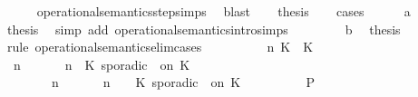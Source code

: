 \begin{isabellebody}
\ \ \ \ \isamarkupfalse%
\ operational{\isacharunderscore}semantics{\isacharunderscore}step{\isachardot}simps\ \isamarkupfalse%
\ blast\isanewline
\ \ \isamarkupfalse%
\ {\isacharquery}thesis\isanewline
\ \ \isamarkupfalse%
\ {\isacharparenleft}cases{\isacharparenright}\isanewline
\ \ \ \ \isamarkupfalse%
\ a\isanewline
\ \ \ \ \ \ \isamarkupfalse%
\ {\isacharquery}thesis\ \isamarkupfalse%
\ {\isacharparenleft}simp\ add{\isacharcolon}\ operational{\isacharunderscore}semantics{\isacharunderscore}intro{\isachardot}simps{\isacharparenright}\isanewline
\ \ \isamarkupfalse%
\isanewline
\ \ \ \ \isamarkupfalse%
\ b\ \isamarkupfalse%
\ {\isacharquery}thesis\isanewline
\ \ \ \ \isamarkupfalse%
\ {\isacharparenleft}rule\ operational{\isacharunderscore}semantics{\isacharunderscore}elim{\isachardot}cases{\isacharparenright}\isanewline
\ \ \ \ \ \ \isamarkupfalse%
\ \ {\isasymGamma}\ n\ K\ {\isasymtau}\ K\ {\isasymPsi}\ {\isasymPhi}\isanewline
\ \ \ \ \ \ \isamarkupfalse%
\ {\isacartoucheopen}{\isacharparenleft}{\isasymGamma}\ n\ {\isasymturnstile}\ {\isasymPsi}\ {\isasymtriangleright}\ {\isasymPhi}\ {\isacharequal}\ {\isacharparenleft}{\isasymGamma}{\isacharcomma}\ n\ {\isasymturnstile}\ {\isacharparenleft}K\ sporadic\ {\isasymtau}\ on\ K\ {\isacharhash}\ {\isasymPsi}\ {\isasymtriangleright}\ {\isasymPhi}{\isacharparenright}{\isacartoucheclose}\isanewline
\ \ \ \ \ \ \ {\isacartoucheopen}{\isacharparenleft}{\isasymGamma}\ n\ {\isasymturnstile}\ {\isasymPsi}\ {\isasymtriangleright}\ {\isasymPhi}\ {\isacharequal}\ {\isacharparenleft}{\isasymGamma}{\isacharcomma}\ n\ {\isasymturnstile}\ {\isasymPsi}\ {\isasymtriangleright}\ {\isacharparenleft}{\isacharparenleft}K\ sporadic\ {\isasymtau}\ on\ K\ {\isacharhash}\ {\isasymPhi}{\isacharparenright}{\isacharparenright}{\isacartoucheclose}\isanewline
\ \ \ \ \ \ \isamarkupfalse%
\ {\isacharquery}P\ \isamarkupfalse%

\end{isabellebody}
